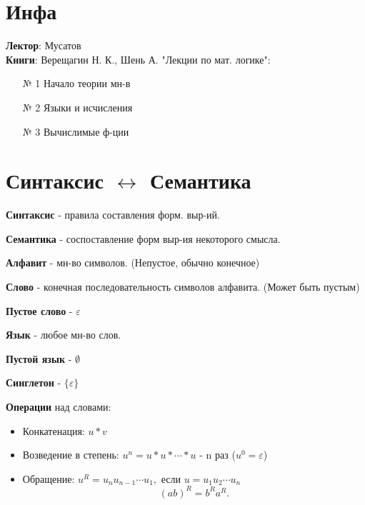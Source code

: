 
\section{Инфа}
\textbf{Лектор}: Мусатов \\
\textbf{Книги}: Верещагин Н. К., Шень А. "Лекции по мат. логике":
\begin{enumerate}
    \item [№ 1] Начало теории мн-в
    \item [№ 2] Языки и исчисления
    \item [№ 3] Вычислимые ф-ции
\end{enumerate}

\section{Синтаксис $\leftrightarrow$ Семантика}
\begin{definition}
\textbf{Синтаксис} - правила составления форм. выр-ий.
\end{definition}
\begin{definition}
\textbf{Семантика} - соспоставление форм выр-ия некоторого смысла.
\end{definition}
\begin{definition}
\textbf{Алфавит} - мн-во символов. (Непустое, обычно конечное)
\end{definition}
\begin{definition}
\textbf{Слово} - конечная последовательность символов алфавита. (Может быть пустым)

\textbf{Пустое слово} -  $\varepsilon$
\end{definition}
\begin{definition}
\textbf{Язык} - любое мн-во слов.

\textbf{Пустой язык} - $\emptyset$
 
\textbf{Синглетон} - $\{\varepsilon\}$
\end{definition}

\textbf{Операции} над словами:
\begin{itemize}
    \item Конкатенация: $u * v$
    \item Возведение в степень:  $u^{n} = u * u * \cdots * u$ - n раз ($u^{0} = \varepsilon$)
    \item Обращение: $u^{R} = u_n u_{n - 1} \cdots  u_1, \text{ если } u = u_1 u_2 \cdots u_n$
        \[
            (ab)^{R} = b^{R}a^{R}
        .\] 
\end{itemize}

